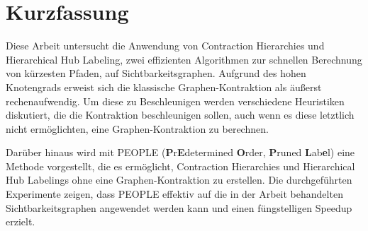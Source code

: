 \chapter*{Kurzfassung}

Diese Arbeit untersucht die Anwendung von Contraction Hierarchies und Hierarchical Hub Labeling, zwei effizienten Algorithmen zur schnellen Berechnung von kürzesten Pfaden, auf Sichtbarkeitsgraphen.
Aufgrund des hohen Knotengrads erweist sich die klassische Graphen-Kontraktion als äußerst rechenaufwendig.
Um diese zu Beschleunigen werden verschiedene Heuristiken diskutiert, die die Kontraktion beschleunigen sollen, auch wenn es diese letztlich nicht ermöglichten, eine Graphen-Kontraktion zu berechnen.

Darüber hinaus wird mit PEOPLE (\textbf{P}r\textbf{E}determined \textbf{O}rder, \textbf{P}runed \textbf{L}ab\textbf{e}l) eine Methode vorgestellt, die es ermöglicht, Contraction Hierarchies und Hierarchical Hub Labelings ohne eine Graphen-Kontraktion zu erstellen.
Die durchgeführten Experimente zeigen, dass PEOPLE effektiv auf die in der Arbeit behandelten Sichtbarkeitsgraphen angewendet werden kann und einen füngstelligen Speedup erzielt.